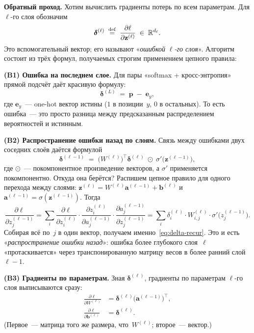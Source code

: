 \textbf{Обратный проход.} Хотим вычислить градиенты потерь по всем
параметрам. Для $\ell$-го слоя обозначим
\begin{equation}\label{eq:delta}
\boldsymbol\delta^{(\ell)}\;\stackrel{\mathrm{def}}{=}\;\frac{\partial \ell}{\partial \mathbf z^{(\ell)}}\;\in\;\mathbb{R}^{d_\ell}.
\end{equation}
Это вспомогательный вектор; его называют «\emph{ошибкой $\ell$-го
слоя}». Алгоритм состоит из трёх формул, получаемых строгим
применением цепного правила:

\textbf{(B1) Ошибка на последнем слое.}
Для пары «softmax + кросс-энтропия» прямой подсчёт даёт
красивую формулу:
\begin{equation}\label{eq:delta-last}
\boldsymbol\delta^{(L)}\;=\;\mathbf p\;-\;\mathbf e_y,
\end{equation}
где $\mathbf e_y$~--- one-hot вектор истины ($1$ в позиции~$y$, $0$ в
остальных). То есть ошибка~--- это просто разница между предсказанным
распределением вероятностей и истинным.

\textbf{(B2) Распространение ошибки назад по слоям.}
Связь между ошибками двух соседних слоёв даётся формулой
\begin{equation}\label{eq:delta-recur}
\boldsymbol\delta^{(\ell-1)}\;=\;\bigl(W^{(\ell)}\bigr)^{\top}\boldsymbol\delta^{(\ell)}\;\odot\;\sigma'\!\bigl(\mathbf z^{(\ell-1)}\bigr),
\end{equation}
где $\odot$~--- покомпонентное произведение векторов, а $\sigma'$
применяется покомпонентно. Откуда она берётся? Распишем цепное правило
для одного перехода между слоями: $\mathbf z^{(\ell)}=W^{(\ell)}\mathbf a^{(\ell-1)}+\mathbf b^{(\ell)}$
и $\mathbf a^{(\ell-1)}=\sigma(\mathbf z^{(\ell-1)})$. Тогда
\[
\frac{\partial\ell}{\partial z^{(\ell-1)}_j}
   =\sum_{i}\frac{\partial\ell}{\partial z^{(\ell)}_i}\cdot
                \frac{\partial z^{(\ell)}_i}{\partial a^{(\ell-1)}_j}\cdot
                \frac{\partial a^{(\ell-1)}_j}{\partial z^{(\ell-1)}_j}
   =\sum_{i}\delta^{(\ell)}_i\cdot W^{(\ell)}_{i,j}\cdot \sigma'\!\bigl(z^{(\ell-1)}_j\bigr).
\]
Собирая всё по~$j$ в один вектор, получаем именно~\eqref{eq:delta-recur}.
Это и есть «\emph{распространение ошибки назад}»: ошибка более глубокого
слоя~$\ell$ «протаскивается» через транспонированную матрицу весов в
более ранний слой~$\ell-1$.

\textbf{(B3) Градиенты по параметрам.}
Зная $\boldsymbol\delta^{(\ell)}$, градиенты по параметрам $\ell$-го
слоя выписываются сразу:
\begin{align}
\frac{\partial \ell}{\partial W^{(\ell)}}
   &= \boldsymbol\delta^{(\ell)}\bigl(\mathbf a^{(\ell-1)}\bigr)^{\top},
   \label{eq:grad-W}\\
\frac{\partial \ell}{\partial \mathbf b^{(\ell)}}
   &= \boldsymbol\delta^{(\ell)}. \label{eq:grad-b}
\end{align}
(Первое~--- матрица того же размера, что~$W^{(\ell)}$; второе~---
вектор.)

